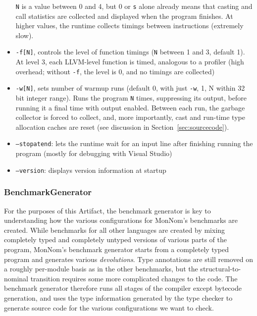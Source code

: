 \documentclass{article}
\newcommand{\refsec}[1]{Section~\ref{sec:#1}}
\begin{document}
\begin{itemize}
\texttt{N} is a value between 0 and 4, but 0 or \texttt{s} alone already means that casting and call statistics are collected and displayed when the program finishes.
At higher values, the runtime collects timings between instructions (extremely slow).
\item \texttt{-f[N]}, controls the level of function timings (\texttt{N} between 1 and 3, default 1). At level 3, each LLVM-level function is timed, analogous to a profiler (high overhead; without \texttt{-f}, the level is 0, and no timings are collected)
\item \texttt{-w[N]}, sets number of warmup runs (default 0, with just \texttt{-w}, 1, N within 32 bit integer range).
Runs the program \texttt{N} times, suppressing its output, before running it a final time with output enabled.
Between each run, the garbage collector is forced to collect, and, more importantly, cast and run-time type allocation caches are reset (see discussion in \refsec{sourcecode}).
\item \texttt{--stopatend}: lets the runtime wait for an input line after finishing running the program (mostly for debugging with Visual Studio)
\item \texttt{--version}: displays version information at startup
\end{itemize}

\subsubsection{BenchmarkGenerator}
\label{sec:benchmark-generator}
For the purposes of this Artifact, the benchmark generator is key to understanding how the various configurations for MonNom's benchmarks are created.
While benchmarks for all other languages are created by mixing completely typed and completely untyped versions of various parts of the program, MonNom's benchmark generator starts from a completely typed program and generates various \emph{devolutions}.
Type annotations are still removed on a roughly per-module basis as in the other benchmarks, but the structural-to-nominal transition requires some more complicated changes to the code.
The benchmark generator therefore runs all stages of the compiler except bytecode generation, and uses the type information generated by the type checker to generate source code for the various configurations we want to check.
\end{document}
